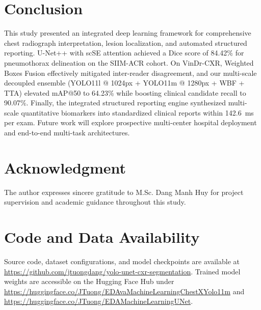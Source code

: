 \documentclass[10pt,twocolumn,letterpaper]{article}
\begin{document}
\section{Conclusion}
This study presented an integrated deep learning framework for comprehensive chest radiograph interpretation, lesion localization, and automated structured reporting. U-Net++ with scSE attention achieved a Dice score of 84.42\% for pneumothorax delineation on the SIIM-ACR cohort. On VinDr-CXR, Weighted Boxes Fusion effectively mitigated inter-reader disagreement, and our multi-scale decoupled ensemble (YOLO11l @ 1024px + YOLO11m @ 1280px + WBF + TTA) elevated mAP@50 to 64.23\% while boosting clinical candidate recall to 90.07\%. Finally, the integrated structured reporting engine synthesized multi-scale quantitative biomarkers into standardized clinical reports within 142.6~ms per exam. Future work will explore prospective multi-center hospital deployment and end-to-end multi-task architectures.

\section*{Acknowledgment}
The author expresses sincere gratitude to M.Sc. Dang Manh Huy for project supervision and academic guidance throughout this study.

\section*{Code and Data Availability}
Source code, dataset configurations, and model checkpoints are available at \url{https://github.com/jtuongdang/yolo-unet-cxr-segmentation}. Trained model weights are accessible on the Hugging Face Hub under \url{https://huggingface.co/JTuong/EDAvaMachineLearningChestXYolo11m} and \url{https://huggingface.co/JTuong/EDAMachineLearningUNet}.
\end{document}
